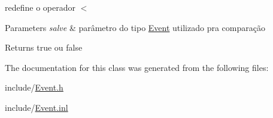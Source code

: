 redefine o operador $<$ 


\begin{DoxyParams}{Parameters}
{\em salve} & parâmetro do tipo \hyperlink{class_event}{Event} utilizado pra comparação \\
\hline
\end{DoxyParams}
\begin{DoxyReturn}{Returns}
true ou false 
\end{DoxyReturn}


The documentation for this class was generated from the following files\+:\begin{DoxyCompactItemize}
\item 
include/\hyperlink{_event_8h}{Event.\+h}\item 
include/\hyperlink{_event_8inl}{Event.\+inl}\end{DoxyCompactItemize}
